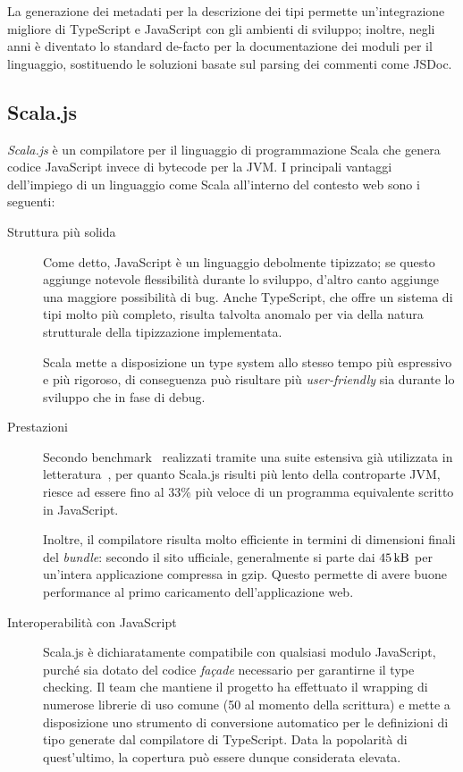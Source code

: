       La generazione dei metadati per la descrizione dei tipi permette un'integrazione migliore di TypeScript e JavaScript con gli ambienti di sviluppo;
      inoltre, negli anni è diventato lo standard de-facto per la documentazione dei moduli per il linguaggio, sostituendo le soluzioni basate sul parsing dei commenti come JSDoc.

    \subsection{Scala.js}\label{subsec:scalajs}
      \emph{Scala.js} è un compilatore per il linguaggio di programmazione Scala che genera codice JavaScript invece di bytecode per la JVM\@.
      I principali vantaggi dell'impiego di un linguaggio come Scala all'interno del contesto web sono i seguenti:
      \begin{description}
        \item[Struttura più solida]
          Come detto, JavaScript è un linguaggio debolmente tipizzato;
          se questo aggiunge notevole flessibilità durante lo sviluppo, d'altro canto aggiunge una maggiore possibilità di bug.
          Anche TypeScript, che offre un sistema di tipi molto più completo, risulta talvolta anomalo per via della natura strutturale della tipizzazione implementata.

          Scala mette a disposizione un type system allo stesso tempo più espressivo e più rigoroso, di conseguenza può risultare più \emph{user-friendly} sia durante lo sviluppo che in fase di debug.

        \item[Prestazioni]
          Secondo benchmark~\cite{Doeraene:256862} realizzati tramite una suite estensiva già utilizzata in letteratura~\cite{10.1145/3093334.2989232}, per quanto Scala.js risulti più lento della controparte JVM, riesce ad essere fino al 33\% più veloce di un programma equivalente scritto in JavaScript.

          Inoltre, il compilatore risulta molto efficiente in termini di dimensioni finali del \emph{bundle}:
          secondo il sito ufficiale, generalmente si parte dai \(\SI{45}{\kilo\byte}\) per un'intera applicazione compressa in gzip.
          Questo permette di avere buone performance al primo caricamento dell'applicazione web.

        \item[Interoperabilità con JavaScript]
          Scala.js è dichiaratamente compatibile con qualsiasi modulo JavaScript, purché sia dotato del codice \emph{façade} necessario per garantirne il type checking.
          Il team che mantiene il progetto ha effettuato il wrapping di numerose librerie di uso comune (50 al momento della scrittura) e mette a disposizione uno strumento di conversione automatico per le definizioni di tipo generate dal compilatore di TypeScript.
          Data la popolarità di quest'ultimo, la copertura può essere dunque considerata elevata.


\end{description}
